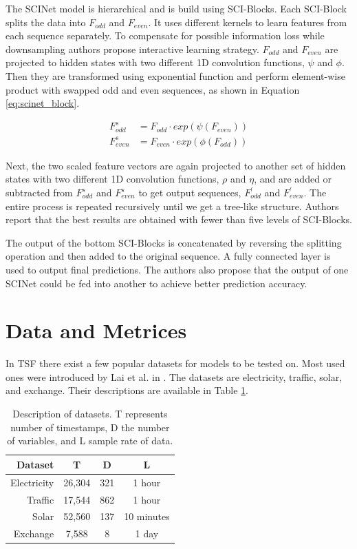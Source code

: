\documentclass[conference]{IEEEtran}
\begin{document}
The SCINet model is hierarchical and is build using SCI-Blocks.
Each SCI-Block splits the data into $F_{odd}$ and $F_{even}$.
It uses different kernels to learn features from each sequence separately.
To compensate for possible information loss while downsampling authors propose interactive learning strategy.
$F_{odd}$ and $F_{even}$ are projected to hidden states with two different 1D convolution functions, $\psi$ and $\phi$.
Then they are transformed using exponential function and perform element-wise product with swapped odd and even sequences, as shown in Equation \ref{eq:scinet_block}.

\begin{equation}
\label{eq:scinet_block}
\begin{split}
    F_{odd}^{s} &= F_{odd} \cdot exp(\psi(F_{even})) \\
    F_{even}^{s} &= F_{even} \cdot exp(\phi(F_{odd}))
\end{split}
\end{equation}

Next, the two scaled feature vectors are again projected to another set of hidden states with two different 1D convolution functions, $\rho$ and $\eta$, and are added or subtracted from $F_{odd}^{s}$ and $F_{even}^{s}$ to get output sequences, $F_{odd}^{'}$ and $F_{even}^{'}$.
The entire process is repeated recursively until we get a tree-like structure.
Authors report that the best results are obtained with fewer than five levels of SCI-Blocks.

The output of the bottom SCI-Blocks is concatenated by reversing the splitting operation and then added to the original sequence.
A fully connected layer is used to output final predictions.
The authors also propose that the output of one SCINet could be fed into another to achieve better prediction accuracy.

\section{Data and Metrices}
\label{chap:data}

In TSF there exist a few popular datasets for models to be tested on.
Most used ones were introduced by Lai et al. in \cite{lai2018lstnet}.
The datasets are electricity, traffic, solar, and exchange.
Their descriptions are available in Table \ref{tab:datasets1}.

\begin{table}[]
    \centering
    \begin{tabular}{r|ccc}
        Dataset & T & D & L \\
        \hline
        Electricity & 26,304 & 321 & 1 hour \\
        Traffic & 17,544 & 862 & 1 hour \\
        Solar & 52,560 & 137 & 10 minutes \\
        Exchange & 7,588 & 8 & 1 day \\
    \end{tabular}
    \caption{Description of datasets. T represents number of timestamps, D the number of variables, and L sample rate of data.}
    \label{tab:datasets1}
\end{table}
\end{document}
